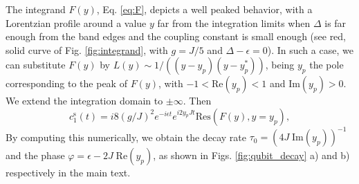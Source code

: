 \documentclass[aps,pra,twocolumn,floatfix,superscriptaddress]{revtex4-1}%
\begin{document}
The integrand $F(y)$, Eq. \eqref{eq:F}, depicts a well peaked behavior, with a Lorentzian profile around a value $y$ far from the integration limits when $\Delta$ is far enough from the band edges and the coupling constant is small enough (see red, solid curve of Fig. \ref{fig:integrand}, with $g=J/5$ and $\Delta-\epsilon=0$). In such a case, we can substitute $F(y)$ by $L(y)\sim 1/((y-y_p)(y-y_p^*))$, being $y_p$ the pole corresponding to the peak of $F(y)$, with $-1<\text{Re}(y_p)<1$ and $\text{Im}(y_p)>0$. We extend the integration domain to $\pm\infty$. Then
\begin{equation}
c_1^\text{s}(t) = i8(g/J)^2 e^{-i\epsilon t}e^{i2y_p Jt}\text{Res}(F(y),y=y_p),
\end{equation}
By computing this numerically, we obtain the decay rate  $\tau_0 = (4J\;\text{Im}(y_p))^{-1}$ and the phase $\varphi = \epsilon - 2J\;\text{Re}(y_p)$, as shown in Figs. \ref{fig:qubit_decay} a) and b) respectively in the main text.

\end{document}

